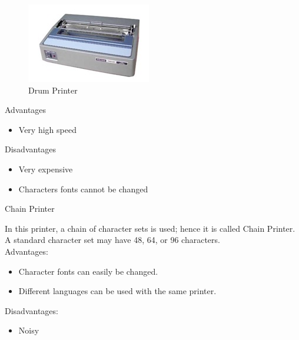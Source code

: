 \documentclass[11pt,a4paper,twoside]{article}
\begin{document}
\begin{figure}[H]
\centering \includegraphics[scale=1]{Fig 17.jpg}
\caption{Drum Printer}
\end{figure}
\noindent Advantages  
\begin{itemize}
    \item Very high speed
\end{itemize}
Disadvantages  
\begin{itemize}
    \item Very expensive
\item Characters fonts cannot be changed
\end{itemize}
Chain Printer\par 
In this printer, a chain of character sets is used; hence it is called Chain Printer. A standard character set may have 48, 64, or 96 characters. \\
Advantages:
\begin{itemize}
    \item Character fonts can easily be changed.
\item Different languages can be used with the same printer.
\end{itemize}
Disadvantages:
\begin{itemize}
    \item Noisy
\end{itemize}
\end{document}
